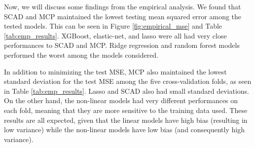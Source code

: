 \documentclass[final,onefignum,onetabnum]{siuro210301}
\begin{document}
	
	Now, we will discuss some findings from the empirical analysis.	We found that SCAD and MCP maintained the lowest testing mean squared error among the tested models. This can be seen in Figure \ref{fig:empirical_mse} and Table \ref{tab:emp_results}. XGBoost, elastic-net, and lasso were all had very close performances to SCAD and MCP. Ridge regression and random forest models performed the worst among the models considered.

	In addition to minimizing the test MSE, MCP also maintained the lowest standard deviation for the test MSE among the five cross-validation folds, as seen in Table \ref{tab:emp_results}. Lasso and SCAD also had small standard deviations. On the other hand, the non-linear models had very different performances on each fold, meaning that they are more sensitive to the training data used. These results are all expected, given that the linear models have high bias (resulting in low variance) while the non-linear models have low bias (and consequently high variance). %
\end{document}
